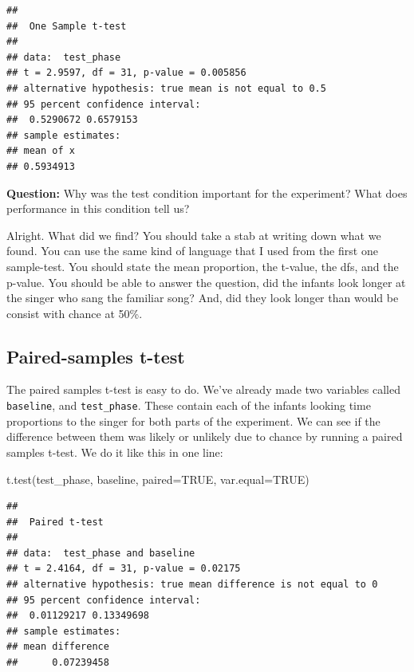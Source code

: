\documentclass[
]{book}
\newenvironment{Shaded}{\begin{snugshade}}{\end{snugshade}}
\newcommand{\AttributeTok}[1]{\textcolor[rgb]{0.77,0.63,0.00}{#1}}
\newcommand{\ConstantTok}[1]{\textcolor[rgb]{0.00,0.00,0.00}{#1}}
\newcommand{\FunctionTok}[1]{\textcolor[rgb]{0.00,0.00,0.00}{#1}}
\newcommand{\NormalTok}[1]{#1}
\begin{document}
\begin{verbatim}
## 
##  One Sample t-test
## 
## data:  test_phase
## t = 2.9597, df = 31, p-value = 0.005856
## alternative hypothesis: true mean is not equal to 0.5
## 95 percent confidence interval:
##  0.5290672 0.6579153
## sample estimates:
## mean of x 
## 0.5934913
\end{verbatim}

\textbf{Question:} Why was the test condition important for the experiment? What does performance in this condition tell us?

Alright. What did we find? You should take a stab at writing down what we found. You can use the same kind of language that I used from the first one sample-test. You should state the mean proportion, the t-value, the dfs, and the p-value. You should be able to answer the question, did the infants look longer at the singer who sang the familiar song? And, did they look longer than would be consist with chance at 50\%.

\hypertarget{paired-samples-t-test}{%
\subsection{Paired-samples t-test}\label{paired-samples-t-test}}

The paired samples t-test is easy to do. We've already made two variables called \texttt{baseline}, and \texttt{test\_phase}. These contain each of the infants looking time proportions to the singer for both parts of the experiment. We can see if the difference between them was likely or unlikely due to chance by running a paired samples t-test. We do it like this in one line:

\begin{Shaded}
\begin{Highlighting}[]
\FunctionTok{t.test}\NormalTok{(test\_phase, baseline, }\AttributeTok{paired=}\ConstantTok{TRUE}\NormalTok{, }\AttributeTok{var.equal=}\ConstantTok{TRUE}\NormalTok{)}
\end{Highlighting}
\end{Shaded}

\begin{verbatim}
## 
##  Paired t-test
## 
## data:  test_phase and baseline
## t = 2.4164, df = 31, p-value = 0.02175
## alternative hypothesis: true mean difference is not equal to 0
## 95 percent confidence interval:
##  0.01129217 0.13349698
## sample estimates:
## mean difference 
##      0.07239458
\end{verbatim}
\end{document}
